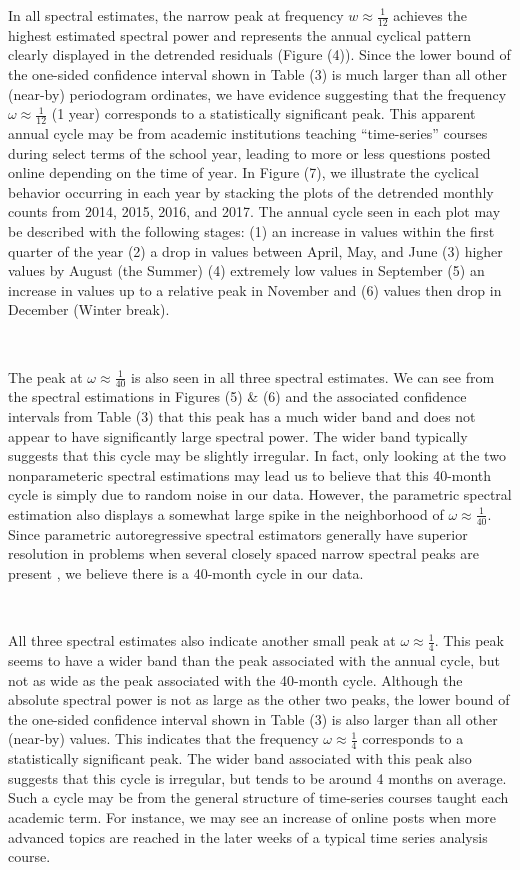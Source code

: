 \documentclass[10pt]{article}
\begin{document}
In all spectral estimates, the narrow peak at frequency $w \approx \frac{1}{12}$ achieves the highest estimated spectral power and represents the annual cyclical pattern clearly displayed in the detrended residuals (Figure (4)). Since the lower bound of the one-sided confidence interval shown in Table (3) is much larger than all other (near-by) periodogram ordinates, we have evidence suggesting that the frequency $\omega \approx \frac{1}{12}$ (1 year) corresponds to a statistically significant peak. This apparent annual cycle may be from academic institutions teaching ``time-series'' courses during select terms of the school year, leading to more or less questions posted online depending on the time of year. In Figure (7), we illustrate the cyclical behavior occurring in each year by stacking the plots of the detrended monthly counts from 2014, 2015, 2016, and 2017. The annual cycle seen in each plot may be described with the following stages: (1) an increase in values within the first quarter of the year (2) a drop in values between April, May, and June (3) higher values by August (the Summer) (4) extremely low values in September (5) an increase in values up to a relative peak in November and (6) values then drop in December (Winter break).

\

The peak at $\omega \approx \frac{1}{40}$ is also seen in all three spectral estimates. We can see from the spectral estimations in Figures (5) \& (6) and the associated confidence intervals from Table (3) that this peak has a much wider band and does not appear to have significantly large spectral power. The wider band typically suggests that this cycle may be slightly irregular. In fact, only looking at the two nonparameteric spectral estimations may lead us to believe that this 40-month cycle is simply due to random noise in our data. However, the parametric spectral estimation also displays a somewhat large spike in the neighborhood of $\omega \approx \frac{1}{40}$. Since parametric autoregressive spectral estimators generally have superior resolution in problems when several closely spaced narrow spectral peaks are present \cite{Shumway}, we believe there is a 40-month cycle in our data. 

\

All three spectral estimates also indicate another small peak at $\omega \approx \frac{1}{4}$. This peak seems to have a wider band than the peak associated with the annual cycle, but not as wide as the peak associated with the 40-month cycle. Although the absolute spectral power is not as large as the other two peaks, the lower bound of the one-sided confidence interval shown in Table (3) is also larger than all other (near-by) values. This indicates that the frequency $\omega \approx \frac{1}{4}$ corresponds to a statistically significant peak. The wider band associated with this peak also suggests that this cycle is irregular, but tends to be
around 4 months on average. Such a cycle may be from the general structure of time-series courses taught each academic term. For instance, we may see an increase of online posts when more advanced topics are reached in the later weeks of a typical time series analysis course. 
\end{document}
